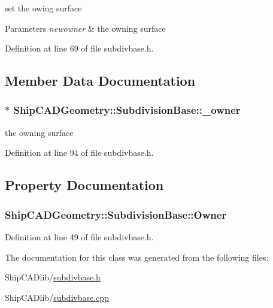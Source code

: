 set the owing surface 


\begin{DoxyParams}{Parameters}
{\em newowner} & the owning surface \\
\hline
\end{DoxyParams}


Definition at line 69 of file subdivbase.\-h.



\subsection{Member Data Documentation}
\hypertarget{classShipCADGeometry_1_1SubdivisionBase_a5a9ce820f644a1ecd9ddb802270f31a9}{
\subsubsection[{\-\_\-owner}]{$\ast$ Ship\-C\-A\-D\-Geometry\-::\-Subdivision\-Base\-::\-\_\-owner\hspace{0.3cm}{\ttfamily [protected]}}}\label{classShipCADGeometry_1_1SubdivisionBase_a5a9ce820f644a1ecd9ddb802270f31a9}
the owning surface 

Definition at line 94 of file subdivbase.\-h.



\subsection{Property Documentation}
\hypertarget{classShipCADGeometry_1_1SubdivisionBase_af3adf1c6df9fd4ddb5c945193fe5c65e}{
\subsubsection[{Owner}]{ Ship\-C\-A\-D\-Geometry\-::\-Subdivision\-Base\-::\-Owner\hspace{0.3cm}{\ttfamily [read]}}}\label{classShipCADGeometry_1_1SubdivisionBase_af3adf1c6df9fd4ddb5c945193fe5c65e}


Definition at line 49 of file subdivbase.\-h.



The documentation for this class was generated from the following files\-:\begin{DoxyCompactItemize}
\item 
Ship\-C\-A\-Dlib/\hyperlink{subdivbase_8h}{subdivbase.\-h}\item 
Ship\-C\-A\-Dlib/\hyperlink{subdivbase_8cpp}{subdivbase.\-cpp}\end{DoxyCompactItemize}
